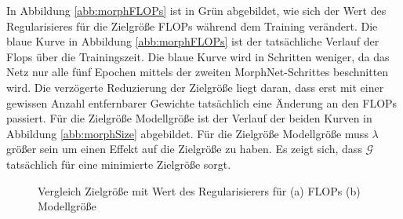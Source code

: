 In Abbildung \ref{abb:morphFLOPs} ist in Grün abgebildet, wie sich der Wert des Regularisieres für die Zielgröße FLOPs während dem Training verändert. Die blaue Kurve in Abbildung \ref{abb:morphFLOPs} ist der tatsächliche Verlauf der Flops über die Trainingszeit. Die blaue Kurve wird in Schritten weniger, da das Netz nur alle fünf Epochen mittels der zweiten MorphNet-Schrittes beschnitten wird. Die verzögerte Reduzierung der Zielgröße liegt daran, dass erst mit einer gewissen Anzahl entfernbarer Gewichte tatsächlich eine Änderung an den FLOPs passiert. Für die Zielgröße Modellgröße ist der Verlauf der beiden Kurven in Abbildung \ref{abb:morphSize} abgebildet. Für die Zielgröße Modellgröße muss $\lambda$ größer sein um einen Effekt auf die Zielgröße zu haben. Es zeigt sich, dass $\mathcal{G}$ tatsächlich für eine minimierte Zielgröße sorgt.

\begin{figure}
     \centering
     \hfill
     \caption{Vergleich Zielgröße mit Wert des Regularisierers für (a) FLOPs (b) Modellgröße }
     \label{abb:morph1}
\end{figure}


